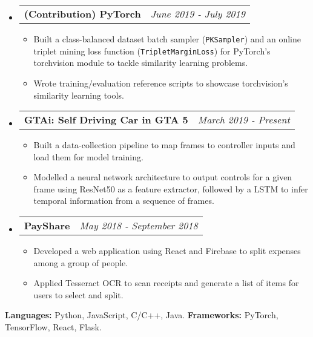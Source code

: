 \documentclass[letterpaper, 11pt]{article}
\makeatletter
\newcommand{\resitem}[1]{\item #1 \vspace{-2pt}}
\newcommand{\resheading}[1]{{\large \parashade[.9]{sharpcorners}{\textbf{#1 \vphantom{p\^{E}}}}}}
\newcommand{\ressubheadinga}[2]{
\begin{tabular*}{7.11in}{l@{\extracolsep{\fill}}r}
		\textbf{#1} & #2 \\
\end{tabular*}}
\makeatother
\begin{document}
\begin{itemize}
\item
    \ressubheadinga{(Contribution) PyTorch}{\emph{June 2019 - July 2019}}
    \vspace{-0.25in}
    \begin{itemize}
            \resitem{Built a class-balanced dataset batch sampler (\texttt{PKSampler}) and an online triplet mining loss function (\texttt{TripletMarginLoss}) for PyTorch's torchvision module to tackle similarity learning problems.}
            \resitem{Wrote training/evaluation reference scripts to showcase torchvision's similarity learning tools.}
    \end{itemize}

\item
    \ressubheadinga{GTAi: Self Driving Car in GTA 5}{\emph{March 2019 - Present}}
    \vspace{-0.25in}
    \begin{itemize}
            \resitem{Built a data-collection pipeline to map frames to controller inputs and load them for model training.}
            \resitem{Modelled a neural network architecture to output controls for a given frame using ResNet50 as a feature extractor, followed by a LSTM to infer temporal information from a sequence of frames.}
    \end{itemize}

\item
    \ressubheadinga{PayShare}{\emph{May 2018 - September 2018}}
    \vspace{-0.25in}
    \begin{itemize}
        \resitem{Developed a web application using React and Firebase to split expenses among a group of people.}
        \resitem{Applied Tesseract OCR to scan receipts and generate a list of items for users to select and split.}
    \end{itemize}

\end{itemize}

\vspace{-0.16in}
\resheading{Skills}
\vspace{-0.10in}

\textbf{Languages:} Python, JavaScript, C/C++, Java. \textbf{Frameworks:} PyTorch, TensorFlow, React, Flask.
\end{document}
